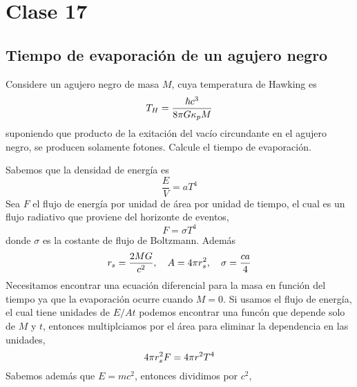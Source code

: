 \section{Clase 17}
\subsection{Tiempo de evaporación de un agujero negro}
\begin{ej}
	Considere un agujero negro de masa $M$, cuya temperatura de Hawking es
	\begin{equation}
  T_H=\frac{\hbar c^3}{8\pi G\kappa_p M}
\end{equation}
suponiendo que producto de la exitación del vacío circundante en el agujero negro, se producen solamente fotones. Calcule el tiempo de evaporación.
\end{ej}

\begin{sol}
	Sabemos que la densidad de energía es
	\begin{equation}
  \frac{E}{V}=aT^4
\end{equation}
Sea $F$ el flujo de energía por unidad de área por unidad de tiempo, el cual es un flujo radiativo que proviene del horizonte de eventos,
\begin{equation}
  F=\sigma T^4
\end{equation}
donde $\sigma$ es la costante de flujo de Boltzmann. Además
\begin{equation}
  r_s=\frac{2MG}{c^2},\quad A=4\pi r_s^2,\quad \sigma=\frac{ca}{4}
\end{equation}
Necesitamos encontrar una ecuación diferencial para la masa en función del tiempo ya que la evaporación ocurre cuando $M=0$. Si usamos el flujo de energía, el cual tiene unidades de $E/At$ podemos encontrar una funcón que depende solo de $M$ y $t$, entonces multiplciamos por el área para eliminar la dependencia en las unidades,
\begin{equation}
  4\pi r_s^2F=4\pi r^2T^4
\end{equation}
Sabemos además que $E=mc^2$, entonces dividimos por $c^2$,





\end{sol}